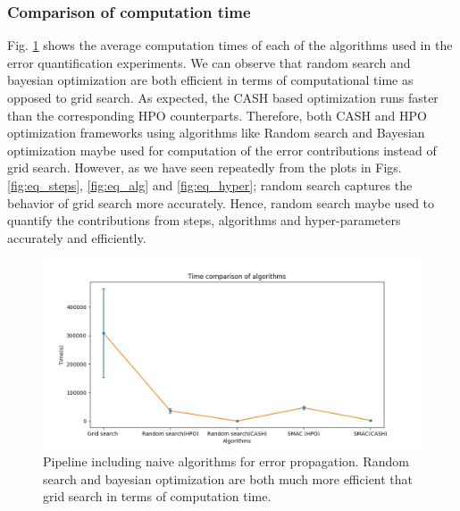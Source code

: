 \subsubsection{Comparison of computation time}
Fig. \ref{fig:time} shows the average computation times of each of the algorithms used in the error quantification experiments. We can observe that random search and bayesian optimization are both efficient in terms of computational time as opposed to grid search. As expected, the CASH based optimization runs faster than the corresponding HPO counterparts.
Therefore, both CASH and HPO optimization frameworks using algorithms like Random search and Bayesian optimization maybe used for computation of the error contributions instead of grid search. However, as we have seen repeatedly from the plots in Figs. \ref{fig:eq_steps}, \ref{fig:eq_alg} and \ref{fig:eq_hyper}; random search captures the behavior of grid search more accurately. Hence, random search maybe used to quantify the contributions from steps, algorithms and hyper-parameters accurately and efficiently.

\begin{figure}[H]
    \centering
    \includegraphics[scale=0.4]{img/EP/times_algorithms}
    \caption{Pipeline including naive algorithms for error propagation. Random search and bayesian optimization are both much more efficient that grid search in terms of computation time.}
    \label{fig:time}
\end{figure}




